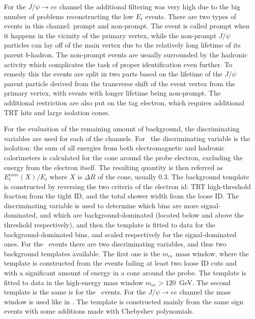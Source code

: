 For the $J/\psi \to ee$ channel the additional filtering was very high due to the big number of problems reconstructing the low $E_{t}$ events. There are two types of events in this channel: prompt and non-prompt. The event is called prompt when it happens in the vicinity of the primary vertex, while the non-prompt $J/\psi$ particles can lay off of the main vertex due to the relatively long lifetime of its parent $b$-hadron. The non-prompt events are usually surrounded by the hadronic activity which complicates the task of proper identification even further. To remedy this the events are split in two parts based on the lifetime of the $J/\psi$ parent particle derived from the transverse shift of the event vertex from the primary vertex, with events with longer lifetime being non-prompt. The additional restriction are also put on the tag electron, which requires additional TRT hits and large isolation cones.

For the evaluation of the remaining amount of background, the discriminating variables are used for each of the channels. For \Wenu\ the discriminating variable is the isolation: the sum of all energies from both electromagnetic and hadronic calorimeters is calculated for the cone around the probe electron, excluding the energy from the electron itself. The resulting quantity is then referred as $E_{t}^{cone}(X)/E_{t}$ where $X$ is $\Delta R$ of the cone, usually $0.3$. The background template is constructed by reversing the two criteria of the electron id: TRT high-threshold fraction from the tight ID, and the total shower width from the loose ID. The discriminating variable is used to determine which bins are more signal-dominated, and which are background-dominated (located below and above the threshold respectively), and then the template is fitted to data for the background-dominated bins, and scaled respectively for the signal-dominated ones. For the \Zee\ events there are two discriminating variables, and thus two background templates available. The first one is the $m_{ee}$ mass window, where the template is constructed from the events failing at least two loose ID cuts and with a significant amount of energy in a cone around the probe. The template is fitted to data in the high-energy mass window $m_{ee} > 120$~GeV. The second template is the same is for the \Wenu\ events. For the $J/\psi \to ee$ channel the mass window is used like in \Zee. The template is constructed mainly from the same sign events with some additions made with Chebyshev polynomials.

